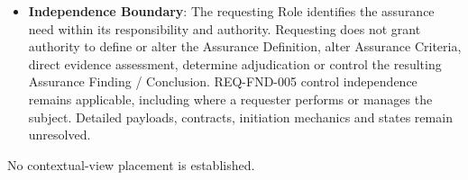 \begin{itemize}
\item
\textbf{Independence Boundary}: The requesting Role identifies the assurance need within its responsibility and authority. Requesting does not grant authority to define or alter the Assurance Definition, alter Assurance Criteria, direct evidence assessment, determine adjudication or control the resulting Assurance Finding /\allowbreak{} Conclusion. REQ-FND-005 control independence remains applicable, including where a requester performs or manages the subject. Detailed payloads, contracts, initiation mechanics and states remain unresolved.



\end{itemize}





No contextual-view placement is established.


